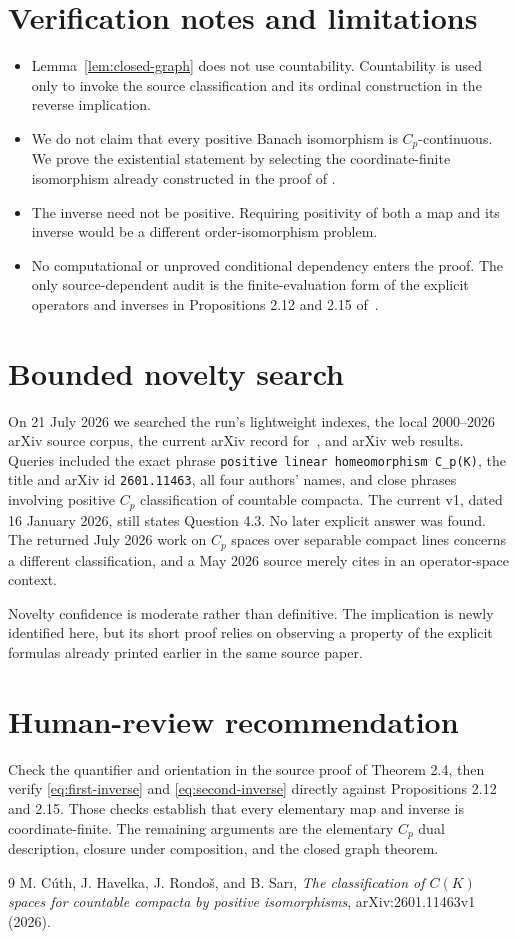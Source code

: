 \documentclass[11pt]{article}
\begin{document}
\section{Verification notes and limitations}
\begin{itemize}
\item Lemma~\ref{lem:closed-graph} does not use countability.  Countability is
used only to invoke the source classification and its ordinal construction in
the reverse implication.
\item We do not claim that every positive Banach isomorphism is
$C_p$-continuous.  We prove the existential statement by selecting the
coordinate-finite isomorphism already constructed in the proof of
\cite[Theorem 2.4]{CHRS}.
\item The inverse need not be positive.  Requiring positivity of both a map
and its inverse would be a different order-isomorphism problem.
\item No computational or unproved conditional dependency enters the proof.
The only source-dependent audit is the finite-evaluation form of the explicit
operators and inverses in Propositions 2.12 and 2.15 of~\cite{CHRS}.
\end{itemize}

\section{Bounded novelty search}
On 21 July 2026 we searched the run's lightweight indexes, the local
2000--2026 arXiv source corpus, the current arXiv record for~\cite{CHRS}, and
arXiv web results.  Queries included the exact phrase
\texttt{positive linear homeomorphism C\_p(K)}, the title and arXiv id
\texttt{2601.11463}, all four authors' names, and close phrases involving
positive $C_p$ classification of countable compacta.  The current v1, dated
16 January 2026, still states Question 4.3.  No later explicit answer was
found.  The returned July 2026 work on $C_p$ spaces over separable compact
lines concerns a different classification, and a May 2026 source merely cites
\cite{CHRS} in an operator-space context.

Novelty confidence is moderate rather than definitive.  The implication is
newly identified here, but its short proof relies on observing a property of
the explicit formulas already printed earlier in the same source paper.

\section{Human-review recommendation}
Check the quantifier and orientation in the source proof of Theorem 2.4, then
verify \eqref{eq:first-inverse} and \eqref{eq:second-inverse} directly against
Propositions 2.12 and 2.15.  Those checks establish that every elementary map
and inverse is coordinate-finite.  The remaining arguments are the elementary
$C_p$ dual description, closure under composition, and the closed graph
theorem.

\begin{thebibliography}{9}
M. Cúth, J. Havelka, J. Rondoš, and B. Sarı,
\emph{The classification of $C(K)$ spaces for countable compacta by positive
isomorphisms}, arXiv:2601.11463v1 (2026).
\end{thebibliography}
\end{document}
